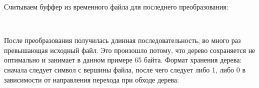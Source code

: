 Считываем буффер из временного файла для последнего преобразования:

{}\\

\pagebreak

После преобразования получилась длинная последовательность, во много раз превышающая исходный файл. Это произошло потому, что дерево сохраняется не оптимально и занимает в данном примере 65 байта. Формат хранения дерева: сначала следует символ с вершины файла, после чего следует либо 1, либо 0 в зависимости от направления перехода при обходе дерева:

